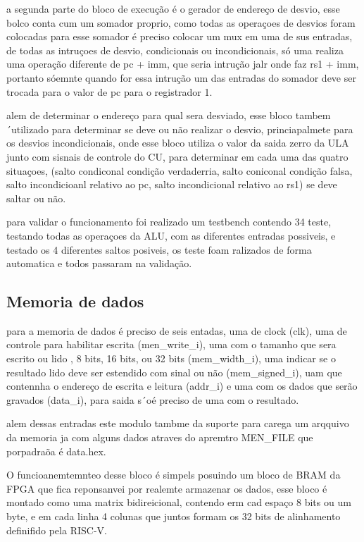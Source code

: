a segunda parte do bloco de execução é o gerador de endereço de desvio, esse bolco conta cum um somador proprio, como todas as operaçoes de desvios foram colocadas para esse somador é preciso colocar um mux em uma de sus entradas, de todas as intruçoes de desvio, condicionais ou incondicionais, só uma realiza uma operação diferente de pc + imm, que seria  intrução jalr onde faz rs1 + imm, portanto sóemnte quando for essa intrução um das entradas do somador deve ser trocada para o valor de pc para o registrador 1. 


alem de determinar o endereço para qual sera desviado, esse bloco tambem ´utilizado para determinar se deve ou não realizar o desvio, princiapalmete para os desvios incondicionais, onde esse bloco utiliza o valor da saida zerro da ULA junto com sisnais de controle do CU, para determinar em cada uma das quatro situaçoes, (salto condiconal condição verdaderria, salto coniconal condição falsa, salto incondicioanl relativo ao pc, salto incondicional relativo ao rs1) se deve saltar ou não.



para validar o funcionamento foi realizado um testbench contendo 34 teste, testando todas as operaçoes da ALU, com as diferentes entradas possiveis, e testado os 4 diferentes saltos posiveis, os teste foam ralizados de forma automatica e todos passaram na validação.

\subsection{Memoria de dados}
\label{sub:memoeria_dados}

para a memoria de dados é preciso de seis entadas, uma de clock (clk), uma de controle para habilitar escrita (men_write_i), uma com o tamanho que sera escrito ou lido , 8 bits, 16 bits, ou 32 bits (mem_width_i), uma indicar se o resultado lido deve ser estendido com sinal ou não (mem_signed_i), uam que contennha o endereço de escrita e leitura (addr_i) e uma com os dados que serão gravados (data_i), para saida  s´oé preciso de uma com o resultado.

alem dessas entradas este modulo tambme da suporte para  carega um arqquivo da memoria ja com alguns dados atraves do apremtro MEN_FILE que porpadraõa é data.hex.

O funcioanemtemnteo desse bloco é simpels posuindo um bloco de BRAM da FPGA que fica reponsanvei por realemte armazenar os dados, esse bloco é montado como uma matrix bidireicional, contendo erm cad espaço 8 bits ou um byte, e em cada linha 4 colunas que juntos formam os 32 bits de alinhamento definifido pela RISC-V.

